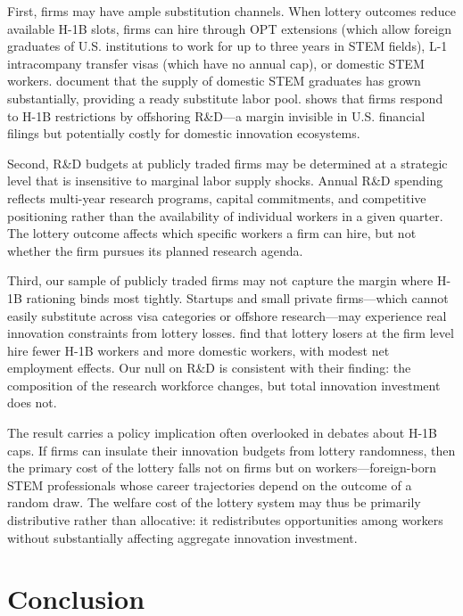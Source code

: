 \documentclass[12pt]{article}
\begin{document}
First, firms may have ample substitution channels. When lottery outcomes reduce available H-1B slots, firms can hire through OPT extensions (which allow foreign graduates of U.S. institutions to work for up to three years in STEM fields), L-1 intracompany transfer visas (which have no annual cap), or domestic STEM workers. \citet{bound2017} document that the supply of domestic STEM graduates has grown substantially, providing a ready substitute labor pool. \citet{glennon2020} shows that firms respond to H-1B restrictions by offshoring R\&D---a margin invisible in U.S. financial filings but potentially costly for domestic innovation ecosystems.

Second, R\&D budgets at publicly traded firms may be determined at a strategic level that is insensitive to marginal labor supply shocks. Annual R\&D spending reflects multi-year research programs, capital commitments, and competitive positioning rather than the availability of individual workers in a given quarter. The lottery outcome affects which specific workers a firm can hire, but not whether the firm pursues its planned research agenda.

Third, our sample of publicly traded firms may not capture the margin where H-1B rationing binds most tightly. Startups and small private firms---which cannot easily substitute across visa categories or offshore research---may experience real innovation constraints from lottery losses. \citet{doran2022} find that lottery losers at the firm level hire fewer H-1B workers and more domestic workers, with modest net employment effects. Our null on R\&D is consistent with their finding: the composition of the research workforce changes, but total innovation investment does not.

The result carries a policy implication often overlooked in debates about H-1B caps. If firms can insulate their innovation budgets from lottery randomness, then the primary cost of the lottery falls not on firms but on workers---foreign-born STEM professionals whose career trajectories depend on the outcome of a random draw. The welfare cost of the lottery system may thus be primarily distributive rather than allocative: it redistributes opportunities among workers without substantially affecting aggregate innovation investment.

\section{Conclusion}
\end{document}
